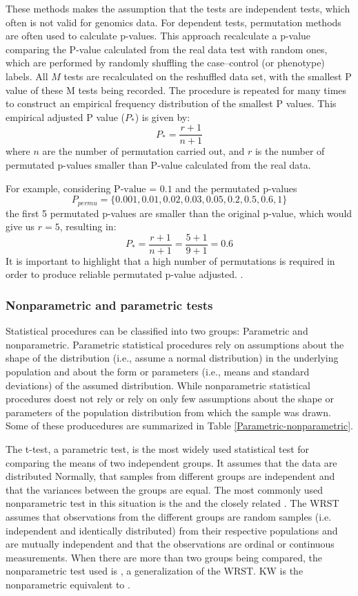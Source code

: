 These methods makes the assumption that
the tests are independent tests, which often is not valid for genomics data.
For dependent tests, permutation methods are often used to calculate
 p-values.  This approach recalculate a p-value comparing the P-value calculated
 from the real data test with random ones,
 which are performed by randomly shuffling the case–control (or phenotype)
 labels. All $M$ tests are recalculated on the reshuffled data set, with the smallest P value of these M tests being recorded. The procedure is repeated for many times to construct an empirical frequency distribution of the smallest P values.
This  empirical adjusted P value ($P_{*}$) is given by: $$P_{*} = \frac{r + 1}{n + 1}$$ where $n$ are the number of
permutation carried out, and $r$ is the number of permutated p-values smaller than P-value calculated
from the real data.

For example, considering $\textrm{P-value = 0.1}$ and the
permutated p-values $$P_{permu} =\{0.001,0.01,0.02,0.03,0.05,0.2,0.5,0.6,1\}$$ the first 5 permutated p-values
are smaller than the original p-value, which would give us $r = 5$, resulting in:
$$P_{*} = \frac{r + 1}{n + 1} =  \frac{5 + 1}{9 + 1} = 0.6 $$
It is important to highlight that
a high number of permutations is required in order to produce reliable permutated p-value adjusted.
 \cite{davison1997bootstrap,north2002note,north2003note,sham2014statistical}.


\subsubsection{Nonparametric and parametric tests}

Statistical procedures can be classified into two groups:  Parametric and nonparametric.
Parametric statistical procedures rely on assumptions about the shape of the distribution
(i.e., assume a normal distribution) in the underlying population and about the form or
parameters (i.e., means and standard deviations) of the assumed distribution.
While nonparametric statistical procedures doest not rely or rely on only few assumptions about the shape or
parameters of the population distribution from which the sample was drawn.
Some of these producedures are summarized in Table \ref{Parametric-nonparametric}.

The t-test, a parametric test, is the most widely used statistical test for comparing the means of two independent groups.
It assumes that the data are distributed Normally, that samples from different groups are independent and that the variances between the groups are equal. The most commonly used nonparametric test in this situation is the  and the closely related . The WRST assumes that observations from the different groups are random samples (i.e. independent and identically distributed) from their respective populations and are mutually independent and that the observations are ordinal or continuous measurements.
When there are more than two groups being compared,
the nonparametric test used is , a generalization of the WRST. KW is the nonparametric equivalent to .


